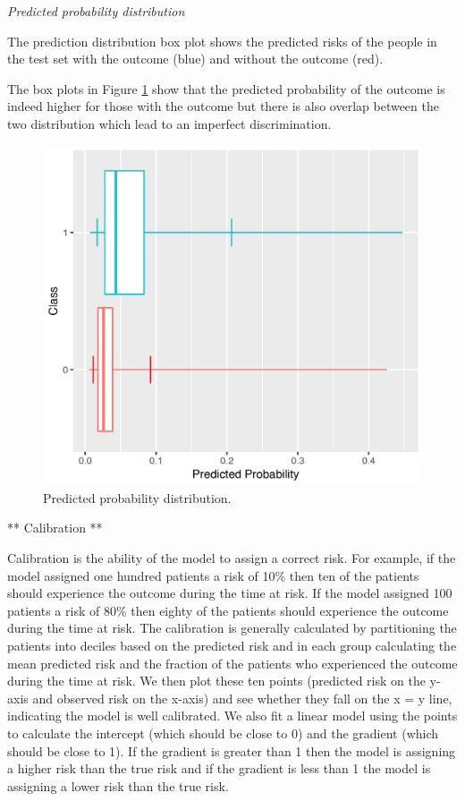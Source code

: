 \documentclass[11pt]{book}
\begin{document}
\emph{Predicted probability distribution}

The prediction distribution box plot shows the predicted risks of the
people in the test set with the outcome (blue) and without the outcome
(red).

The box plots in Figure \ref{fig:plpPredProb} show that the predicted
probability of the outcome is indeed higher for those with the outcome
but there is also overlap between the two distribution which lead to an
imperfect discrimination.

\begin{figure}

{\centering \includegraphics[width=0.9\linewidth]{images/PatientLevelPrediction/predictionDistribution} 

}

\caption{Predicted probability distribution.}\label{fig:plpPredProb}
\end{figure}

** Calibration **

Calibration is the ability of the model to assign a correct risk. For
example, if the model assigned one hundred patients a risk of 10\% then
ten of the patients should experience the outcome during the time at
risk. If the model assigned 100 patients a risk of 80\% then eighty of
the patients should experience the outcome during the time at risk. The
calibration is generally calculated by partitioning the patients into
deciles based on the predicted risk and in each group calculating the
mean predicted risk and the fraction of the patients who experienced the
outcome during the time at risk. We then plot these ten points
(predicted risk on the y-axis and observed risk on the x-axis) and see
whether they fall on the x = y line, indicating the model is well
calibrated. We also fit a linear model using the points to calculate the
intercept (which should be close to 0) and the gradient (which should be
close to 1). If the gradient is greater than 1 then the model is
assigning a higher risk than the true risk and if the gradient is less
than 1 the model is assigning a lower risk than the true risk.
\end{document}
